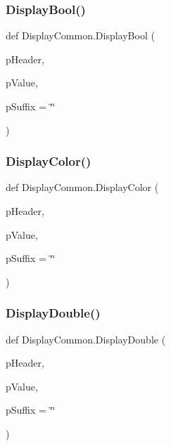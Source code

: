 \mbox{\label{namespace_display_common_a2c249f8d9928bf838f7b5bb7c0ca8736}} 
\subsubsection{\texorpdfstring{Display\+Bool()}{DisplayBool()}}
{\footnotesize\ttfamily def Display\+Common.\+Display\+Bool (\begin{DoxyParamCaption}\item[{}]{p\+Header,  }\item[{}]{p\+Value,  }\item[{}]{p\+Suffix = {\ttfamily \char`\"{}\char`\"{}} }\end{DoxyParamCaption})}

\mbox{\label{namespace_display_common_a960eed99c7344a16f151e8da6b614efd}} 
\subsubsection{\texorpdfstring{Display\+Color()}{DisplayColor()}}
{\footnotesize\ttfamily def Display\+Common.\+Display\+Color (\begin{DoxyParamCaption}\item[{}]{p\+Header,  }\item[{}]{p\+Value,  }\item[{}]{p\+Suffix = {\ttfamily \char`\"{}\char`\"{}} }\end{DoxyParamCaption})}

\mbox{\label{namespace_display_common_a0f6cae7a685905873e5b56371c902b82}} 
\subsubsection{\texorpdfstring{Display\+Double()}{DisplayDouble()}}
{\footnotesize\ttfamily def Display\+Common.\+Display\+Double (\begin{DoxyParamCaption}\item[{}]{p\+Header,  }\item[{}]{p\+Value,  }\item[{}]{p\+Suffix = {\ttfamily \char`\"{}\char`\"{}} }\end{DoxyParamCaption})}

